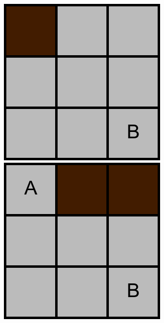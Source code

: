 \begin{figure}[!htb]
\includegraphics[width=\linewidth]{0.png}
\endminipage\hfill
{}
\includegraphics[width=\linewidth]{1.png}

\end{figure}
